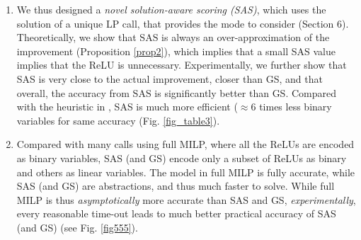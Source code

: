 \begin{enumerate}
	\item We thus designed a {\em novel solution-aware scoring ({\sf SAS})}, which uses the solution of a unique LP call, that provides the mode to consider (Section 6). Theoretically, we show that {\sf SAS} is always an over-approximation of the improvement (Proposition \ref{prop2}), which implies that a small {\sf SAS} value implies that the ReLU is unnecessary. Experimentally, we further show that {\sf SAS} is very close to the actual improvement, closer than {\sf GS}, and that overall, the accuracy from SAS is significantly better than {\sf GS}.  Compared with the heuristic in \cite{DivideAndSlide},  {\sf SAS} is much more efficient ($\approx 6$ times less binary variables for same accuracy (Fig. \ref{fig_table3}). 
	
	\item Compared with many calls using full MILP, where all the ReLUs are encoded as binary variables, {\sf SAS} (and {\sf GS}) encode only a subset of ReLUs as binary and others as linear variables. The model in full MILP is fully accurate, while {\sf SAS} (and {\sf GS})
	are abstractions, and thus much faster to solve. 
	While full MILP is thus {\em asymptotically} more accurate than {\sf SAS} and {\sf GS}, {\em experimentally}, every reasonable time-out leads to much better practical accuracy of {\sf SAS} (and {\sf GS}) (see Fig. \ref{fig555}).

	

\end{enumerate}
